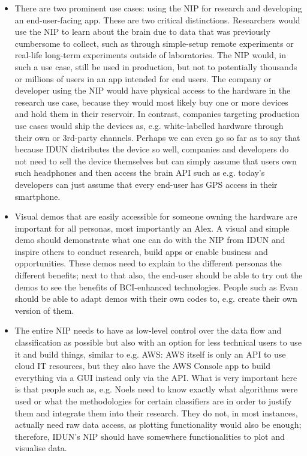\begin{itemize}
  \item There are two prominent use cases: using the NIP for research and developing an end-user-facing app. These are two critical distinctions. Researchers would use the NIP to learn about the brain due to data that was previously cumbersome to collect, such as through simple-setup remote experiments or real-life long-term experiments outside of laboratories. The NIP would, in such a use case, still be used in production, but not to potentially thousands or millions of users in an app intended for end users. The company or developer using the NIP would have physical access to the hardware in the research use case, because they would most likely buy one or more devices and hold them in their reservoir. In contrast, companies targeting production use cases would ship the devices as, e.g. white-labelled hardware through their own or 3rd-party channels. Perhaps we can even go so far as to say that because IDUN distributes the device so well, companies and developers do not need to sell the device themselves but can simply assume that users own such headphones and then access the brain API such as e.g. today's developers can just assume that every end-user has GPS access in their smartphone.
  \item Visual demos that are easily accessible for someone owning the hardware are important for all personas, most importantly an Alex. A visual and simple demo should demonstrate what one can do with the NIP from IDUN and inspire others to conduct research, build apps or enable business and opportunities. These demos need to explain to the different personas the different benefits; next to that also, the end-user should be able to try out the demos to see the benefits of BCI-enhanced technologies. People such as Evan should be able to adapt demos with their own codes to, e.g. create their own version of them.
  \item The entire NIP needs to have as low-level control over the data flow and classification as possible but also with an option for less technical users to use it and build things, similar to e.g. AWS: AWS itself is only an API to use cloud IT resources, but they also have the AWS Console app to build everything via a GUI instead only via the API. What is very important here is that people such as, e.g. Noels need to know exactly what algorithms were used or what the methodologies for certain classifiers are in order to justify them and integrate them into their research. They do not, in most instances, actually need raw data access, as plotting functionality would also be enough; therefore, IDUN's NIP should have somewhere functionalities to plot and visualise data.

\end{itemize}
